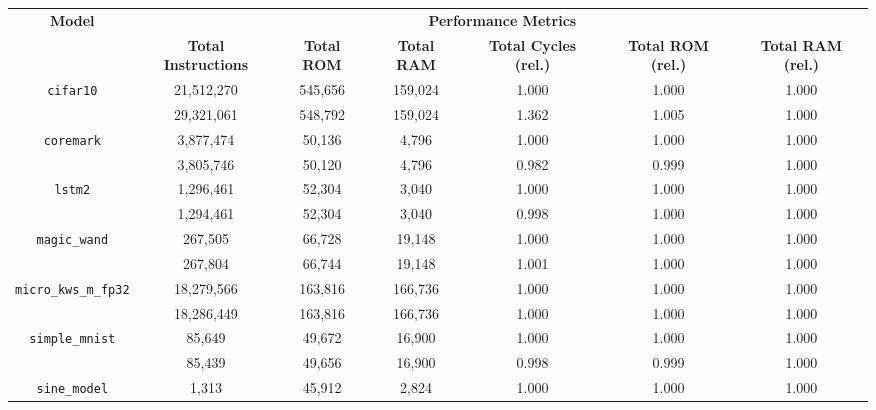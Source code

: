 \begin{sidewaystable}[h!]
    \centering
    \begin{tabular}{|c|c|c|c|c|c|c|}
        \hline
        \multirow{2}{*}{\textbf{Model}} & \multicolumn{6}{c|}{\textbf{Performance Metrics}} \\
        \cline{2-7}
        & \textbf{Total Instructions} & \textbf{Total ROM} & \textbf{Total RAM} & \textbf{Total Cycles (rel.)} & \textbf{Total ROM (rel.)} & \textbf{Total RAM (rel.)} \\
        \hline
        \multirow{2}{*}{\texttt{cifar10}}  & 21,512,270 & 545,656 & 159,024 & 1.000 & 1.000 & 1.000 \\
                                           & 29,321,061 & 548,792 & 159,024 & 1.362 & 1.005 & 1.000 \\
        \cline{2-7}
        \hline
        \multirow{2}{*}{\texttt{coremark}} & 3,877,474 & 50,136 & 4,796 & 1.000 & 1.000 & 1.000 \\
                                           & 3,805,746 & 50,120 & 4,796 & 0.982 & 0.999 & 1.000 \\
        \cline{2-7}
        \hline
        \multirow{2}{*}{\texttt{lstm2}}    & 1,296,461 & 52,304 & 3,040 & 1.000 & 1.000 & 1.000 \\
                                           & 1,294,461 & 52,304 & 3,040 & 0.998 & 1.000 & 1.000 \\
        \cline{2-7}
        \hline
        \multirow{2}{*}{\texttt{magic\_wand}} & 267,505 & 66,728 & 19,148 & 1.000 & 1.000 & 1.000 \\
                                              & 267,804 & 66,744 & 19,148 & 1.001 & 1.000 & 1.000 \\
        \cline{2-7}
        \hline
        \multirow{2}{*}{\texttt{micro\_kws\_m\_fp32}} & 18,279,566 & 163,816 & 166,736 & 1.000 & 1.000 & 1.000 \\
                                                      & 18,286,449 & 163,816 & 166,736 & 1.000 & 1.000 & 1.000 \\
        \cline{2-7}
        \hline
        \multirow{2}{*}{\texttt{simple\_mnist}} & 85,649 & 49,672 & 16,900 & 1.000 & 1.000 & 1.000 \\
                                                & 85,439 & 49,656 & 16,900 & 0.998 & 0.999 & 1.000 \\
        \cline{2-7}
        \hline
        \multirow{2}{*}{\texttt{sine\_model}} & 1,313 & 45,912 & 2,824 & 1.000 & 1.000 & 1.000 \\

\end{tabular}
\end{sidewaystable}
